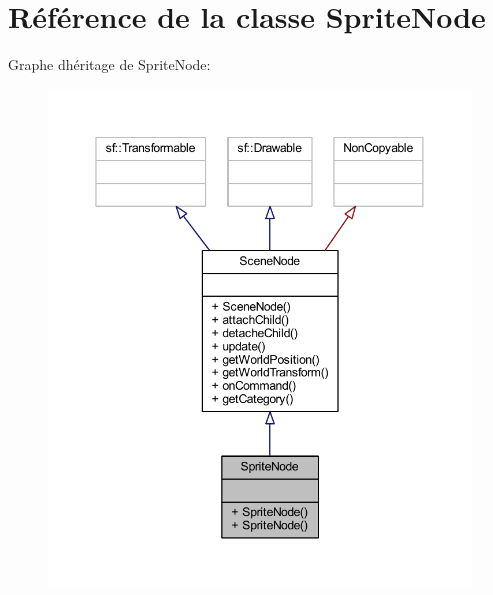 \hypertarget{class_sprite_node}{}\section{Référence de la classe Sprite\+Node}
\label{class_sprite_node}


Graphe d\textquotesingle{}héritage de Sprite\+Node\+:\nopagebreak
\begin{figure}[H]
\begin{center}
\leavevmode
\includegraphics[width=350pt]{class_sprite_node__inherit__graph}
\end{center}
\end{figure}


